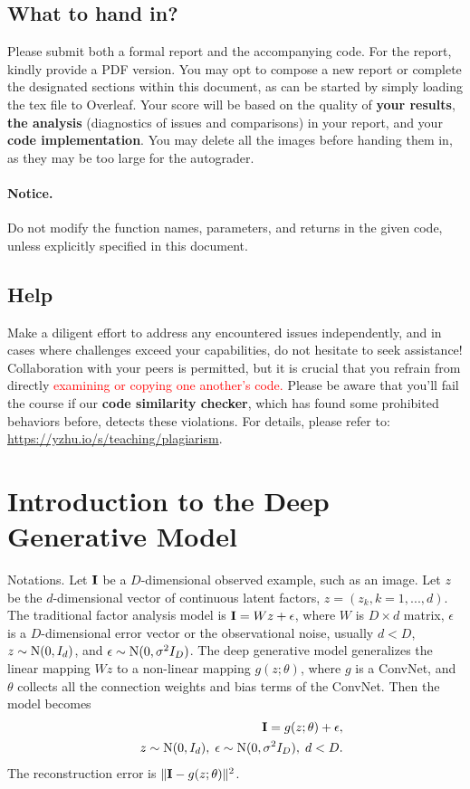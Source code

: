 \documentclass[11pt]{article}
\def\I{{\bf I}}
\begin{document}
\subsection{What to hand in?}

Please submit both a formal report and the accompanying code. For the report, kindly provide a PDF version. You may opt to compose a new report or complete the designated sections within this document, as can be started by simply loading the tex file to Overleaf. Your score will be based on the quality of \textbf{your results}, \textbf{the analysis} (diagnostics of issues and comparisons) in your report, and your \textbf{code implementation}. You may delete all the images before handing them in, as they may be too large for the autograder.

\paragraph{Notice.} Do not modify the function names, parameters, and returns in the given code, unless explicitly specified in this document.

\subsection{Help}

Make a diligent effort to address any encountered issues independently, and in cases where challenges exceed your capabilities, do not hesitate to seek assistance! Collaboration with your peers is permitted, but it is crucial that you refrain from directly \textcolor{red}{examining or copying one another's code.}  Please be aware that you'll fail the course if our \textbf{code similarity checker}, which has found some prohibited behaviors before, detects these violations. For details, please refer to: \url{https://yzhu.io/s/teaching/plagiarism}.

\clearpage

\section{Introduction to the Deep Generative Model}
Notations. Let $\I$ be a $D$-dimensional observed example, such as an image. Let $z$ be the $d$-dimensional vector of continuous latent factors, $z  = (z_k, k = 1, ..., d)$. The traditional factor analysis model is $\I = W z + \epsilon$, where $W$ is $D \times d$ matrix, $\epsilon$ is a $D$-dimensional error vector or the observational noise, usually $d < D$, $z \sim {\rm N}(0, I_d)$, and $\epsilon \sim {\rm N}(0, \sigma^2 I_D)$. The deep generative model generalizes the linear mapping $W z$ to a non-linear mapping $g(z; \theta)$, where $g$ is a ConvNet, and $\theta$ collects all the connection weights and bias terms of the ConvNet. Then the model becomes \begin{eqnarray}
&&\I = g(z; \theta) + \epsilon, \nonumber \\
&&z \sim {\rm N}(0,  I_d), \; \epsilon \sim {\rm N}(0, \sigma^2 I_D), \; d < D.
\label{eq:ConvNetFA}
\end{eqnarray}
The reconstruction error is  $ \| \I - g(z; \theta) \|^2$.
\end{document}
